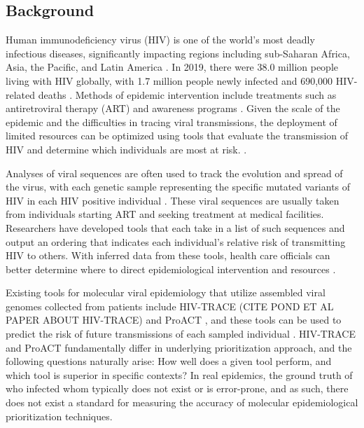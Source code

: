 \documentclass[twocolumn]{bmcart}%
\begin{document}
\begin{multicols}
%

\section*{Background}
Human immunodeficiency virus (HIV) is one of the world's most deadly infectious diseases, significantly impacting regions including sub-Saharan Africa, Asia, the Pacific, and Latin America \cite{cdc1}. In 2019, there were 38.0 million people living with HIV globally, with 1.7 million people newly infected and 690,000 HIV-related deaths \cite{who}. Methods of epidemic intervention include treatments such as antiretroviral therapy (ART) and awareness programs \cite{cdc2}. Given the scale of the epidemic and the difficulties in tracing viral transmissions, the deployment of limited resources can be optimized using tools that evaluate the transmission of HIV and determine which individuals are most at risk. \cite{wertheim2018growth}.

Analyses of viral sequences are often used to track the evolution and spread of the virus, with each genetic sample representing the specific mutated variants of HIV in each HIV positive individual \cite{wertheim2018growth}. These viral sequences are usually taken from individuals starting ART and seeking treatment at medical facilities. Researchers have developed tools that each take in a list of such sequences and output an ordering that indicates each individual's relative risk of transmitting HIV to others. With inferred data from these tools, health care officials can better determine where to direct epidemiological intervention and resources \cite{wertheim2018growth}.

Existing tools for molecular viral epidemiology that utilize assembled viral genomes collected from patients include HIV-TRACE (CITE POND ET AL PAPER ABOUT HIV-TRACE) and ProACT \cite{moshiri2019ProACT}, and these tools can be used to predict the risk of future transmissions of each sampled individual \cite{wertheim2018growth}. HIV-TRACE and ProACT fundamentally differ in underlying prioritization approach, and the following questions naturally arise: How well does a given tool perform, and which tool is superior in specific contexts? In real epidemics, the ground truth of who infected whom typically does not exist or is error-prone, and as such, there does not exist a standard for measuring the accuracy of molecular epidemiological prioritization techniques.


\end{multicols}
\end{document}
